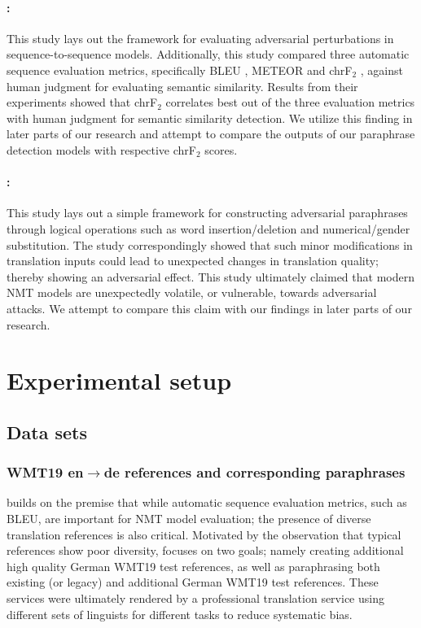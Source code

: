 \documentclass[11pt,a4paper]{article}
\begin{document}
\paragraph{\citet{michel2019evaluation}:} This study lays out the framework for evaluating adversarial perturbations in sequence-to-sequence models. Additionally, this study compared three automatic sequence evaluation metrics, specifically BLEU \cite{papineni2002bleu}, METEOR \cite{denkowski2014meteor} and chrF$_2$ \cite{popovic2015chrf}, against human judgment for evaluating semantic similarity. Results from their experiments showed that chrF$_2$ correlates best out of the three evaluation metrics with human judgment for semantic similarity detection. We utilize this finding in later parts of our research and attempt to compare the outputs of our paraphrase detection models with respective chrF$_2$ scores.

\paragraph{\citet{fadaee2020unreasonable}:} This study lays out a simple framework for constructing adversarial paraphrases through logical operations such as word insertion/deletion and numerical/gender substitution. The study correspondingly showed that such minor modifications in translation inputs could lead to unexpected changes in translation quality; thereby showing an adversarial effect. This study ultimately claimed that modern NMT models are unexpectedly volatile, or vulnerable, towards adversarial attacks. We attempt to compare this claim with our findings in later parts of our research. 

\section{Experimental setup}

\subsection{Data sets}

\subsubsection{WMT19 en$\rightarrow$de references and corresponding paraphrases}

\citet{freitag-bleu-paraphrase-references-2020} builds on the premise that while automatic sequence evaluation metrics, such as BLEU, are important for NMT model evaluation; the presence of diverse translation references is also critical. Motivated by the observation that typical references show poor diversity, \citet{freitag-bleu-paraphrase-references-2020} focuses on two goals; namely creating additional high quality German WMT19 test references, as well as paraphrasing both existing (or legacy) and additional German WMT19 test references. These services were ultimately rendered by a professional translation service using different sets of linguists for different tasks to reduce systematic bias.
\end{document}
